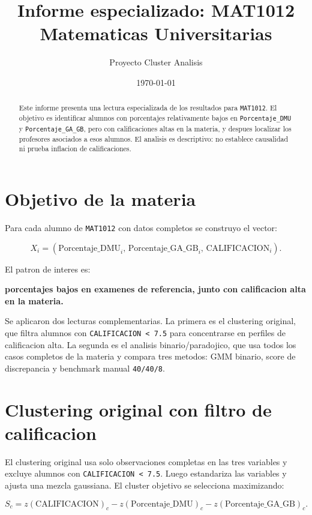 \documentclass[11pt,letterpaper]{article}
\title{\textbf{Informe especializado: MAT1012}\\
\large Matematicas Universitarias}
\author{Proyecto Cluster Analisis}
\date{\today}
\newcommand{\code}[1]{\texttt{#1}}
\begin{document}
\maketitle

\begin{abstract}
Este informe presenta una lectura especializada de los resultados para \code{MAT1012}. El objetivo es identificar alumnos con porcentajes relativamente bajos en \code{Porcentaje\_DMU} y \code{Porcentaje\_GA\_GB}, pero con calificaciones altas en la materia, y despues localizar los profesores asociados a esos alumnos. El analisis es descriptivo: no establece causalidad ni prueba inflacion de calificaciones.
\end{abstract}

\section{Objetivo de la materia}

Para cada alumno de \code{MAT1012} con datos completos se construyo el vector:

\[
X_i =
\left(
\text{Porcentaje\_DMU}_i,\,
\text{Porcentaje\_GA\_GB}_i,\,
\text{CALIFICACION}_i
\right).
\]

El patron de interes es:

\begin{center}
\textbf{porcentajes bajos en examenes de referencia, junto con calificacion alta en la materia.}
\end{center}

Se aplicaron dos lecturas complementarias. La primera es el clustering original, que filtra alumnos con \code{CALIFICACION < 7.5} para concentrarse en perfiles de calificacion alta. La segunda es el analisis binario/paradojico, que usa todos los casos completos de la materia y compara tres metodos: GMM binario, score de discrepancia y benchmark manual \code{40/40/8}.

\section{Clustering original con filtro de calificacion}

El clustering original usa solo observaciones completas en las tres variables y excluye alumnos con \code{CALIFICACION < 7.5}. Luego estandariza las variables y ajusta una mezcla gaussiana. El cluster objetivo se selecciona maximizando:

\[
S_c =
z(\text{CALIFICACION})_c
- z(\text{Porcentaje\_DMU})_c
- z(\text{Porcentaje\_GA\_GB})_c.
\]
\end{document}

